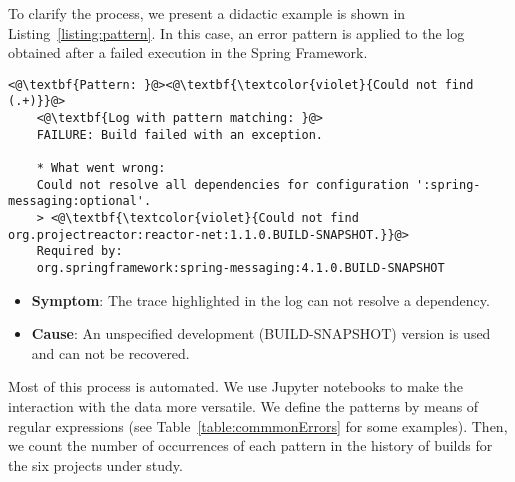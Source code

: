
To clarify the process, we present a didactic example is shown in Listing~\ref{listing:pattern}.
In this case, an error pattern is applied to the log obtained after a failed execution in the Spring Framework.

\begin{center}
	\begin{lstlisting}[linewidth=\linewidth, caption={SpringFramework Log - Commit 8961}, captionpos=b, label={listing:pattern}]
	<@\textbf{Pattern: }@><@\textbf{\textcolor{violet}{Could not find (.+)}}@>
	<@\textbf{Log with pattern matching: }@>
	FAILURE: Build failed with an exception.
	
	* What went wrong:
	Could not resolve all dependencies for configuration ':spring-messaging:optional'.
	> <@\textbf{\textcolor{violet}{Could not find org.projectreactor:reactor-net:1.1.0.BUILD-SNAPSHOT.}}@>
	Required by:
	org.springframework:spring-messaging:4.1.0.BUILD-SNAPSHOT
	\end{lstlisting}
\end{center}


\begin{itemize}
	\item \textbf{{Symptom}}: The trace highlighted in the log can not resolve a dependency.
	\item \textbf{{Cause}}: An unspecified development (BUILD-SNAPSHOT) version is used and can not be recovered.
\end{itemize}




Most of this process is automated.
We use Jupyter notebooks to make the interaction with the data more versatile.
We define the patterns by means of regular expressions (see Table~\ref{table:commmonErrors} for some examples).
Then, we count the number of occurrences of each pattern in the history of builds for the six projects under study.

